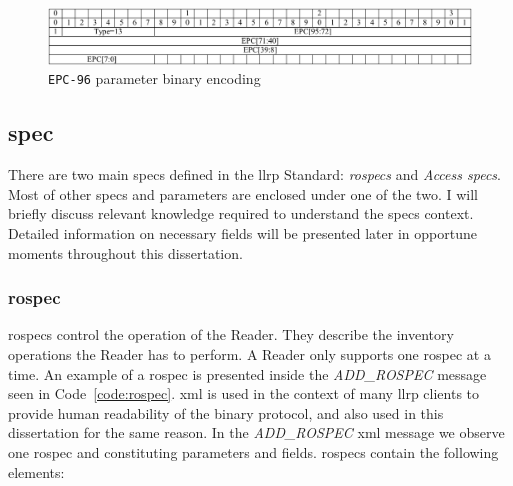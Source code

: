 \begin{figure}[]
    \centering
    \includegraphics[width=\textwidth]{./figs/02-state-of-the-art/EPC96ParameterTVEncoding_bin.pdf}
    \caption[\texttt{EPC-96} parameter binary encoding]{\texttt{EPC-96} parameter binary encoding~\cite{LowLevelReader}}
    \label{fig:EPC96bin}
\end{figure}

\subsection{\acf{spec}}

There are two main \acp{spec} defined in the \ac{llrp} Standard:  \textit{\acp{rospec}} and \textit{Access \acp{spec}}. Most of other \acp{spec} and parameters are enclosed under one of the two.
I will briefly discuss relevant knowledge required to understand the \acp{spec} context. Detailed information on necessary fields will be presented later in opportune moments throughout this dissertation.

\subsubsection{\acf{rospec}}

\acp{rospec} control the operation of the Reader. They describe the inventory operations the Reader has to perform.
A Reader only supports one \ac{rospec} at a time.
An example of a \ac{rospec} is presented inside the \textit{ADD\_ROSPEC} message seen in Code~\ref{code:rospec}. \ac{xml} is used in the context of many \ac{llrp} clients to provide human readability of the binary protocol, and also used in this dissertation for the same reason.
In the \textit{ADD\_ROSPEC} \ac{xml} message we observe one \ac{rospec} and constituting parameters and fields.
\acp{rospec} contain the following elements:

